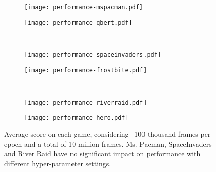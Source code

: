 \documentclass{article}
\begin{document}
\begin{figure}[htb]
    \centering
    \begin{subfigure}{.49\textwidth}
        \centering
        \texttt{[image: performance-mspacman.pdf]}
        \label{fig:perf-mspacman}
    \end{subfigure}
    \begin{subfigure}{.49\textwidth}
        \centering
        \texttt{[image: performance-qbert.pdf]}
        \label{fig:perf-qbert}
    \end{subfigure}\\[-6.4ex]
    \begin{subfigure}{.49\textwidth}
        \centering
        \texttt{[image: performance-spaceinvaders.pdf]}
        \label{fig:perf-spaceinvaders}
    \end{subfigure}
    \begin{subfigure}{.49\textwidth}
        \centering
        \texttt{[image: performance-frostbite.pdf]}
        \label{fig:perf-frostbite}
    \end{subfigure}\\[-6.4ex]
    \begin{subfigure}{.49\textwidth}
        \centering
        \texttt{[image: performance-riverraid.pdf]}
        \label{fig:perf-riverraid}
    \end{subfigure}
    \begin{subfigure}{.49\textwidth}
        \centering
        \texttt{[image: performance-hero.pdf]}
        \label{fig:perf-hero}
    \end{subfigure}\vspace{-1.5\baselineskip}
    
    \caption{Average score on each game, considering ~100 thousand frames per epoch and a total of 10 million frames. Ms. Pacman, SpaceInvaders and River Raid have no significant impact on performance with different hyper-parameter settings.}
    \label{fig:perf}
\end{figure}
\end{document}
